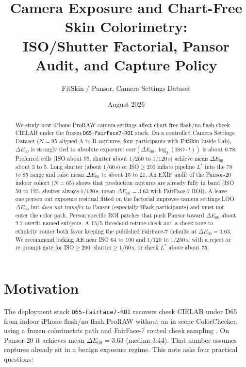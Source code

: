 \documentclass[11pt]{article}
\title{Camera Exposure and Chart-Free Skin Colorimetry:\\
  ISO/Shutter Factorial, Pansor Audit, and Capture Policy}
\author{FitSkin / Pansor, Camera Settings Dataset}
\date{August 2026}
\newcommand{\deee}{\ensuremath{\Delta E_{00}}}
\newcommand{\pipename}{\texttt{D65-FairFace7-ROI}}
\begin{document}
\maketitle

\begin{abstract}
We study how iPhone ProRAW camera settings affect chart free flash/no flash cheek CIELAB under the frozen \pipename{} stack.
On a controlled Camera Settings Dataset ($N=95$ aligned A to H captures, four participants with FitSkin Inside Lab), $\deee$ is strongly tied to absolute exposure: $\mathrm{corr}(\deee,\log_2(\mathrm{ISO}\cdot t))$ is about \num{0.78}.
Preferred cells (ISO about 95, shutter about $1/250$ to $1/120$\,s) achieve mean $\deee$ about \num{3} to \num{5}. Long shutter (about $1/60$\,s) or ISO$\ge$200 inflate pipeline $L^*$ into the 78 to 85 range and raise mean $\deee$ to about 15 to 21.
An EXIF audit of the Pansor-20 indoor cohort ($N=65$) shows that production captures are already fully in band (ISO 50 to 125, shutter always $1/120$\,s, mean $\deee=\num{3.63}$ with FairFace-7 ROI).
A leave one person out exposure residual fitted on the factorial improves camera settings LOO $\deee$ but \emph{does not transfer} to Pansor (especially Black participants) and must not enter the color path.
Person specific ROI patches that push Pansor toward $\deee$ about $2.7$ overfit named subjects. A 15/5 threshold retune check and a cheek tone to ethnicity router both favor keeping the published FairFace-7 defaults at $\deee=\num{3.63}$.
We recommend locking AE near ISO 64 to 100 and $1/120$ to $1/250$\,s, with a reject or re prompt gate for ISO$\ge$200, shutter$\ge 1/60$\,s, or cheek $L^*$ above about 75.
\end{abstract}

\tableofcontents
\newpage

\section{Motivation}

The deployment stack \pipename{} recovers cheek CIELAB under D65 from indoor iPhone flash/no flash ProRAW without an in scene ColorChecker, using a frozen colorimetric path and FairFace-7 routed cheek sampling \cite{d65fairface7note}.
On Pansor-20 it achieves mean $\deee=\num{3.63}$ (median \num{3.44}).
That number assumes captures already sit in a benign exposure regime.
This note asks four practical questions:
\end{document}
